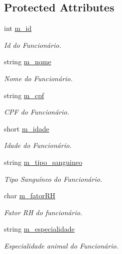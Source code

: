 \subsection*{Protected Attributes}
\begin{DoxyCompactItemize}
\item 
int \hyperlink{classFuncionario_a123c4af00e4e6eea5d4d9366a8bfefed}{m\+\_\+id}
\begin{DoxyCompactList}\small\item\em Id do Funcionário. \end{DoxyCompactList}\item 
string \hyperlink{classFuncionario_a09663cf1395c066ef8cd538ead0f1a10}{m\+\_\+nome}
\begin{DoxyCompactList}\small\item\em Nome do Funcionário. \end{DoxyCompactList}\item 
string \hyperlink{classFuncionario_af367fc8ad2efde9527d1ed0455560690}{m\+\_\+cpf}
\begin{DoxyCompactList}\small\item\em C\+PF do Funcionário. \end{DoxyCompactList}\item 
short \hyperlink{classFuncionario_a2bc5a68aebcf1a792812430ce5c8bdca}{m\+\_\+idade}
\begin{DoxyCompactList}\small\item\em Idade do Funcionário. \end{DoxyCompactList}\item 
string \hyperlink{classFuncionario_a89037092e620b92e1e8e305de50cb2d9}{m\+\_\+tipo\+\_\+sanguineo}
\begin{DoxyCompactList}\small\item\em Tipo Sanguíneo do Funcionário. \end{DoxyCompactList}\item 
char \hyperlink{classFuncionario_ae9e77a47e6604c3d981de2e868619b6d}{m\+\_\+fator\+RH}
\begin{DoxyCompactList}\small\item\em Fator RH do funcionário. \end{DoxyCompactList}\item 
string \hyperlink{classFuncionario_a501682f1767cc891f9908ebc42e9e186}{m\+\_\+especialidade}
\begin{DoxyCompactList}\small\item\em Especialidade animal do Funcionário. \end{DoxyCompactList}\end{DoxyCompactItemize}

